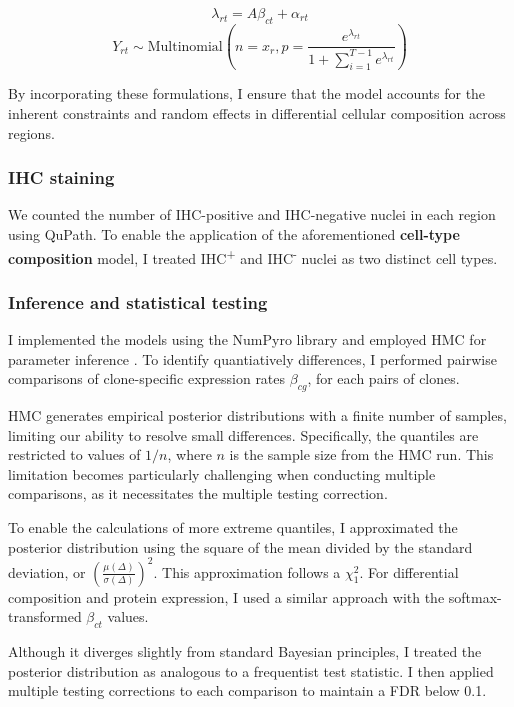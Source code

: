 \begin{equation}
\lambda_{rt} = A\beta_{ct} + \alpha_{rt}
\end{equation}
\begin{equation}
Y_{rt} \sim \text{Multinomial}\left(n=x_r, p=\frac{e^{\lambda_{rt}}}{1 + \sum_{i=1}^{T-1} e^{\lambda_{rt}}}\right)
\end{equation}

By incorporating these formulations, I ensure that the model accounts for the inherent constraints and random effects in differential cellular composition across regions.

\subsubsection*{IHC staining}
We counted the number of IHC-positive and IHC-negative nuclei in each region using QuPath. To enable the application of the aforementioned \textbf{cell-type composition} model, I treated IHC\textsuperscript{+} and IHC\textsuperscript{-} nuclei as two distinct cell types.

\subsubsection*{Inference and statistical testing}

I implemented the models using the \ac{NumPyro} library and employed \acf{HMC} for parameter inference . To identify quantiatively differences, I performed pairwise comparisons of clone-specific expression rates $\beta_{cg}$, for each pairs of clones.

\ac{HMC} generates empirical posterior distributions with a finite number of samples, limiting our ability to resolve small differences. Specifically, the quantiles are restricted to values of $1/n$, where $n$ is the sample size from the \ac{HMC} run. This limitation becomes particularly challenging when conducting multiple comparisons, as it necessitates the multiple testing correction. 

To enable the calculations of more extreme quantiles, I approximated the posterior distribution using the square of the mean divided by the standard deviation, or $\left(\frac{\mu(\Delta)}{\sigma(\Delta)}\right)^2$. This approximation follows a $\chi_{1}^{2}$. For differential composition and protein expression, I used a similar approach with the softmax-transformed $\beta_{ct}$ values. 

Although it diverges slightly from standard Bayesian principles, I treated the posterior distribution as analogous to a frequentist test statistic. I then applied multiple testing corrections to each comparison to maintain a \acf{FDR} below 0.1.

